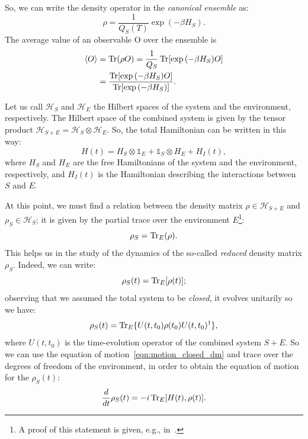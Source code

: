 So, we can write the density operator in the \emph{canonical ensemble} as:
\begin{equation}
    \rho = \frac{1}{Q_S(T)} \exp{(-\beta H_S)}.
\end{equation}
The average value of an observable O over the ensemble is 
\begin{equation}
\begin{split}
    \langle O \rangle &= \operatorname{Tr}(\rho O) = \frac{1}{Q_S} \operatorname{Tr}[\exp{(-\beta H_S)}O] \\
                      &= \frac{\operatorname{Tr}[\exp{(-\beta H_S)}O]}{\operatorname{Tr}[\exp{(-\beta H_S)}]}.
\end{split}
\end{equation}

Let us call $\mathcal{H}_S$ and $\mathcal{H}_E$ the Hilbert spaces of the system and the environment, respectively. The Hilbert space of the combined system is given by the tensor product $\mathcal{H}_{S+E} = \mathcal{H}_S \otimes \mathcal{H}_E$. So, the total Hamiltonian can be written in this way:
\begin{equation}
    H(t) = H_S \otimes \mathds{1}_E + \mathds{1}_S \otimes H_E + H_I(t),
\end{equation}
where $H_S$ and $H_E$ are the free Hamiltonians of the system and the environment, respectively, and $H_I(t)$ is the Hamiltonian describing the interactions between $S$ and $E$.

At this point, we must find a relation between the density matrix $\rho \in \mathcal{H}_{S+E}$ and $\rho_S \in \mathcal{H}_S$; it is given by the partial trace over the environment $E$\footnote{A proof of this statement is given, e.g., in~\cite{nielsen_chuang}.}:
\begin{equation}
    \rho_S = \operatorname{Tr}_E(\rho).
\end{equation}
This helps us in the study of the dynamics of the so-called \emph{reduced} density matrix $\rho_S$. Indeed, we can write:
\begin{equation}
    \rho_S(t) = \operatorname{Tr}_E[\rho(t)];
\end{equation}
observing that we assumed the total system to be \emph{closed}, it evolves unitarily so we have:
\begin{equation}
    \rho_S(t) = \operatorname{Tr}_E\{U(t, t_0)\rho(t_0)U(t, t_0)^\dagger\},
\end{equation}
where $U(t, t_0)$ is the time-evolution operator of the combined system $S+E$. So we can use the equation of motion~\ref{eqn:motion_closed_dm} and trace over the degrees of freedom of the environment, in order to obtain the equation of motion for the $\rho_S(t)$:
\begin{equation}
\label{eqn:motion_open}
    \frac{d}{dt}\rho_S(t) = -i \operatorname{Tr}_E[H(t), \rho(t)].
\end{equation}


